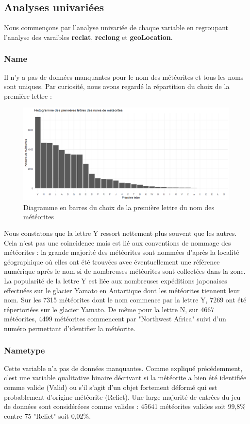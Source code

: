\documentclass[12pt]{article}
\begin{document}
\subsection{Analyses univariées}
Nous commençons par l'analyse univariée de chaque variable en regroupant l'analyse des varaibles \textbf{reclat}, \textbf{reclong} et \textbf{geoLocation}. 
\\
\subsubsection*{Name}
Il n'y a pas de données manquantes pour le nom des météorites et tous les noms sont uniques. Par curiosité, nous avons regardé la répartition du choix de la première lettre :
\begin{figure}[H]
\centering
\includegraphics[width=16cm]{Images/exploration/name_barplot_lettres.png}
\caption{Diagramme en barres du choix de la première lettre du nom des météorites}
\end{figure}
Nous constatons que la lettre Y ressort nettement plus souvent que les autres. Cela n'est pas une coincidence mais est lié aux conventions de nommage des météorites \cite{Convention_nommage_meteorites} : la grande majorité des météorites sont nommées d'après la localité géographique où elles ont été trouvées avec éventuellement une référence numérique après le nom si de nombreuses météorites sont collectées dans la zone. La popularité de la lettre Y est liée aux nombreuses expéditions japonaises effectuées sur le glacier Yamato en Antartique dont les météorites tiennent leur nom. Sur les 7315 météorites dont le nom commence par la lettre Y, 7269 ont été répertoriées sur le glacier Yamato. De même pour la lettre N, sur 4667 météorites, 4499 météorites commencent par "Northwest Africa" suivi d'un numéro permettant d'identifier la météorite.
\subsubsection*{Nametype}
Cette variable n'a pas de données manquantes. Comme expliqué précédemment, c'est une variable qualitative binaire décrivant si la météorite a bien été identifiée comme valide (Valid) ou s'il s'agit d'un objet fortement déformé qui est probablement d'origine météorite (Relict). Une large majorité de entrées du jeu de données sont considéréees comme valides : 45641 météorites valides soit 99,8\% contre 75 "Relict" soit 0,02\%.
\end{document}
